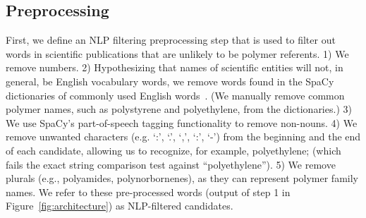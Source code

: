 \subsection{Preprocessing}
First, we define an
NLP filtering preprocessing step that is used to filter out
words in scientific publications that are unlikely to be polymer referents. 1) We remove numbers. 2)
Hypothesizing that names of scientific entities will not, in general, be English
vocabulary words, we remove words found in the SpaCy dictionaries
of commonly used English words~\cite{choi2015depends}. (We manually remove common polymer
names, such as polystyrene and polyethylene, from the dictionaries.) 3) We use
SpaCy's part-of-speech tagging functionality to remove non-nouns. 4) We remove
unwanted characters (e.g. `:', `.', `,', `:', `-') from the beginning and the end of each
candidate, allowing us to recognize, for example, polyethylene; (which fails the
exact string comparison test against ``polyethylene''). 5) We remove plurals (e.g.,
polyamides, polynorbornenes), as they can represent polymer family names.
We refer to these pre-processed words (output of step 1 in Figure~\ref{fig:architecture}) as NLP-filtered candidates.



